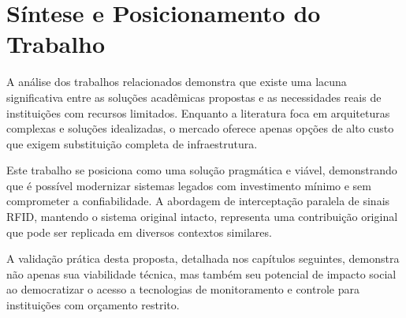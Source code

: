 \section{Síntese e Posicionamento do Trabalho}
\label{Sec:SintesePosicionamento}

A análise dos trabalhos relacionados demonstra que existe uma lacuna significativa entre as soluções acadêmicas propostas e as necessidades reais de instituições com recursos limitados. Enquanto a literatura foca em arquiteturas complexas e soluções idealizadas, o mercado oferece apenas opções de alto custo que exigem substituição completa de infraestrutura.

Este trabalho se posiciona como uma solução pragmática e viável, demonstrando que é possível modernizar sistemas legados com investimento mínimo e sem comprometer a confiabilidade. A abordagem de interceptação paralela de sinais RFID, mantendo o sistema original intacto, representa uma contribuição original que pode ser replicada em diversos contextos similares.

A validação prática desta proposta, detalhada nos capítulos seguintes, demonstra não apenas sua viabilidade técnica, mas também seu potencial de impacto social ao democratizar o acesso a tecnologias de monitoramento e controle para instituições com orçamento restrito.
